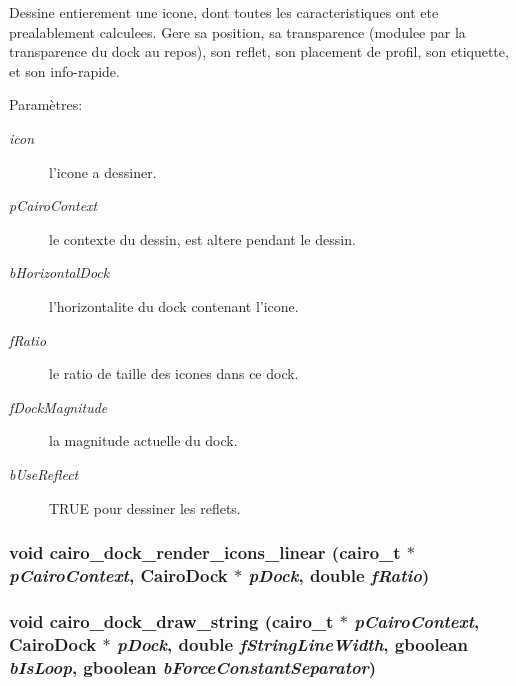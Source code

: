 Dessine entierement une icone, dont toutes les caracteristiques ont ete prealablement calculees. Gere sa position, sa transparence (modulee par la transparence du dock au repos), son reflet, son placement de profil, son etiquette, et son info-rapide. \begin{Desc}
\item[Paramètres:]
\begin{description}
\item[{\em icon}]l'icone a dessiner. \item[{\em pCairoContext}]le contexte du dessin, est altere pendant le dessin. \item[{\em bHorizontalDock}]l'horizontalite du dock contenant l'icone. \item[{\em fRatio}]le ratio de taille des icones dans ce dock. \item[{\em fDockMagnitude}]la magnitude actuelle du dock. \item[{\em bUseReflect}]TRUE pour dessiner les reflets. \end{description}
\end{Desc}
\subsubsection{\setlength{\rightskip}{0pt plus 5cm}void cairo\_\-dock\_\-render\_\-icons\_\-linear (cairo\_\-t $\ast$ {\em pCairoContext}, {\bf CairoDock} $\ast$ {\em pDock}, double {\em fRatio})}\label{cairo-dock-draw_8h_4360118a269b12c5acfdbf2d294db3ed}


\subsubsection{\setlength{\rightskip}{0pt plus 5cm}void cairo\_\-dock\_\-draw\_\-string (cairo\_\-t $\ast$ {\em pCairoContext}, {\bf CairoDock} $\ast$ {\em pDock}, double {\em fStringLineWidth}, gboolean {\em bIsLoop}, gboolean {\em bForceConstantSeparator})}\label{cairo-dock-draw_8h_2b8ce54b5b1ce5b64cba73aa8f2431b6}


